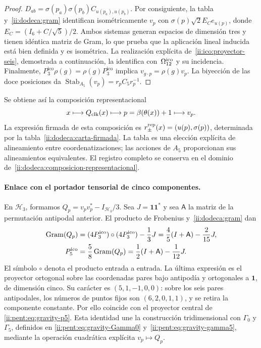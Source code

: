 \begin{proof}
\(D_{ab}=\sigma(p_a)\sigma(p_b)C_{u(p_a),u(p_b)}\).
Por consiguiente, la tabla y~\eqref{ii:dodeca:gram} identifican
isométricamente \(v_p\) con
\(\sigma(p)\sqrt2 E_Ce_{u(p)}\), donde
\(E_C=(I_6+C/\sqrt5)/2\). Ambos sistemas generan espacios de dimensión
tres y tienen idéntica matriz de Gram, lo que prueba que la aplicación
lineal inducida está bien definida y es isométrica. La realización
explícita de~\eqref{ii:ico:proyector-seis}, demostrada a continuación,
la identifica con~\(\Omega_{12}^{\rm ico}\) y su incidencia.
Finalmente, \(P_3^{\mathrm{ico}}\rho(g)=\rho(g)P_3^{\mathrm{ico}}\) implica
\(v_{g\cdot p}=\rho(g)v_p\). La biyección de las doce posiciones da
\(\operatorname{Stab}_{A_5}(v_p)=r_pC_5r_p^{-1}\).
\end{proof}

Se obtiene así la composición representacional
\begin{equation}
 x\longmapsto Q_{\rm clk}(x)\longmapsto
 p=\beta(\theta(x))+1\longmapsto v_p.
 \label{ii:dodeca:composicion-representacional}
\end{equation}
La expresión firmada de esta composición es
\(r_\pm^{\rm rep}(x)=(u(p),\sigma(p))\), determinada por la
tabla~\eqref{ii:dodeca:carta-firmada}. La tabla es una elección explícita
de alineamiento entre coordenatizaciones; las acciones de \(A_5\) proporcionan sus
alineamientos equivalentes. El registro completo se conserva en el
dominio de~\eqref{ii:dodeca:composicion-representacional}.

\paragraph{Enlace con el portador tensorial de cinco componentes.}
En \(\mathcal H_3\), formamos
\(Q_p=v_pv_p^*-I_{\mathcal H_3}/3\). Sea \(J=\mathbf1\mathbf1^*\)
y sea \(\mathsf A\) la matriz de la permutación antipodal anterior.
El producto de Frobenius y~\eqref{ii:dodeca:gram} dan
\begin{equation}
 \begin{aligned}
 \operatorname{Gram}(Q_p)
 &=(4P_3^{\mathrm{ico}})\circ(4P_3^{\mathrm{ico}})-\frac13J
 =\frac45(I+\mathsf A)-\frac2{15}J,
 \\
 P^{\rm ico}_5&=\frac58\operatorname{Gram}(Q_p)
 =\frac12(I+\mathsf A)-\frac1{12}J.
 \end{aligned}
 \label{ii:dodeca:puente-tensorial}
\end{equation}
El símbolo \(\circ\) denota el producto entrada a entrada. La última
expresión es el proyector ortogonal sobre las coordenadas pares bajo
antipodía y ortogonales a \(\mathbf1\), de dimensión cinco. Su carácter
es \((5,1,-1,0,0)\): sobre los seis pares antipodales, los números de
puntos fijos son \((6,2,0,1,1)\), y se retira la componente constante.
Por ello coincide con el proyector central de
\eqref{ii:pent:eq:gravity-p5}. Esta identidad une la construcción
tridimensional con \(\Gamma_0\) y \(\Gamma_5\), definidos en
\eqref{ii:pent:eq:gravity-Gamma0} y~\eqref{ii:pent:eq:gravity-gamma5},
mediante la operación cuadrática explícita \(v_p\mapsto Q_p\).

